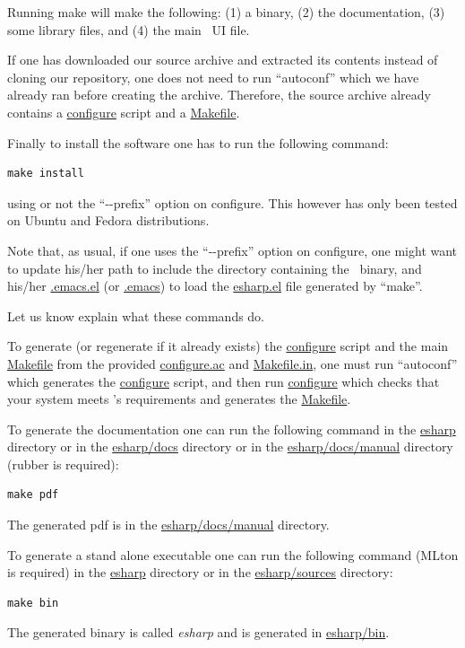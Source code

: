 \documentclass[final]{article}
\begin{document}
Running make will make the following: (1) a binary, (2) the
documentation, (3) some library files, and (4) the main \emacs~UI
file.

If one has downloaded our source archive and extracted its contents
instead of cloning our repository, one does not need to run
``autoconf'' which we have already ran before creating the archive.
Therefore, the source archive already contains a \url{configure}
script and a \url{Makefile}.

Finally to install the software one has to run the following command:
\begin{center}
\begin{verbatim}
make install
\end{verbatim}
\end{center}
using or not the ``$\mbox{-}$$\mbox{-}$prefix'' option on configure.
This however has only been tested on Ubuntu and Fedora distributions.

Note that, as usual, if one uses the ``$\mbox{-}$$\mbox{-}$prefix''
option on configure, one might want to update his/her path to include
the directory containing the \eml\ binary, and his/her \url{.emacs.el}
(or \url{.emacs}) to load the \url{esharp.el} file generated by
``make''.

Let us know explain what these commands do.


%
To generate (or regenerate if it already exists) the \url{configure}
script and the main \url{Makefile} from the provided
\url{configure.ac} and \url{Makefile.in}, one must run ``autoconf''
which generates the \url{configure} script, and then run
\url{configure} which checks that your system meets \eml's
requirements and generates the \url{Makefile}.


%
To generate the documentation one can run the following command
in the \url{esharp} directory or in the \url{esharp/docs} directory or
in the \url{esharp/docs/manual} directory (rubber is required):
\begin{center}
\begin{verbatim}
make pdf
\end{verbatim}
\end{center}
The generated pdf is in the \url{esharp/docs/manual} directory.


%
To generate a stand alone executable one can run the following
command (MLton is required) in the \url{esharp} directory or in the
\url{esharp/sources} directory:
\begin{center}
\begin{verbatim}
make bin
\end{verbatim}
\end{center}
The generated binary is called \emph{esharp} and is generated in
\url{esharp/bin}.
\end{document}
